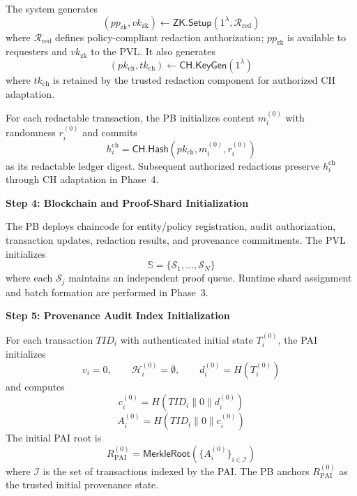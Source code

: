 \documentclass[lettersize,journal]{IEEEtran}
\begin{document}
The system generates
\begin{equation}
(pp_{\mathrm{zk}},vk_{\mathrm{zk}})
\leftarrow
\mathsf{ZK.Setup}(1^\lambda,\mathcal{R}_{\mathrm{red}})
\label{eq:zk-setup}
\end{equation}
where $\mathcal{R}_{\mathrm{red}}$ defines policy-compliant redaction
authorization; $pp_{\mathrm{zk}}$ is available to requesters and
$vk_{\mathrm{zk}}$ to the PVL. It also generates
\begin{equation}
(pk_{\mathrm{ch}},tk_{\mathrm{ch}})
\leftarrow
\mathsf{CH.KeyGen}(1^\lambda)
\label{eq:ch-setup}
\end{equation}
where $tk_{\mathrm{ch}}$ is retained by the trusted redaction component
for authorized CH adaptation.

For each redactable transaction, the PB initializes content
$m_i^{(0)}$ with randomness $r_i^{(0)}$ and commits
\begin{equation}
h_i^{\mathrm{ch}}
=
\mathsf{CH.Hash}
(pk_{\mathrm{ch}},m_i^{(0)},r_i^{(0)})
\label{eq:initial-ch-commitment}
\end{equation}
as its redactable ledger digest. Subsequent authorized redactions preserve
$h_i^{\mathrm{ch}}$ through CH adaptation in Phase~4.

\smallskip
\noindent\textbf{Step 4: Blockchain and Proof-Shard Initialization}

The PB deploys chaincode for entity/policy registration, audit
authorization, transaction updates, redaction results, and provenance
commitments. The PVL initializes
\begin{equation}
\mathbb{S}
=
\{\mathcal{S}_1,\ldots,\mathcal{S}_N\}
\label{eq:proof-shards}
\end{equation}
where each $\mathcal{S}_j$ maintains an independent proof queue.
Runtime shard assignment and batch formation are performed in Phase~3.

\smallskip
\noindent\textbf{Step 5: Provenance Audit Index Initialization}

For each transaction $TID_i$ with authenticated initial state
$T_i^{(0)}$, the PAI initializes
\begin{equation}
v_i=0,\qquad
\mathcal{H}_i^{(0)}=\emptyset,\qquad
d_i^{(0)}=H(T_i^{(0)})
\label{eq:initial-history}
\end{equation}
and computes
\begin{equation}
c_i^{(0)}
=
H(TID_i\parallel0\parallel d_i^{(0)})
\end{equation}
\begin{equation}
A_i^{(0)}
=
H(TID_i\parallel0\parallel c_i^{(0)})
\label{eq:initial-provenance}
\end{equation}
The initial PAI root is
\begin{equation}
R_{\mathrm{PAI}}^{(0)}
=
\mathsf{MerkleRoot}
\left(
\{A_i^{(0)}\}_{i\in\mathcal{I}}
\right)
\label{eq:initial-pai-root}
\end{equation}
where $\mathcal{I}$ is the set of transactions indexed by the PAI.
The PB anchors $R_{\mathrm{PAI}}^{(0)}$ as the trusted initial
provenance state.
\medskip
\end{document}
